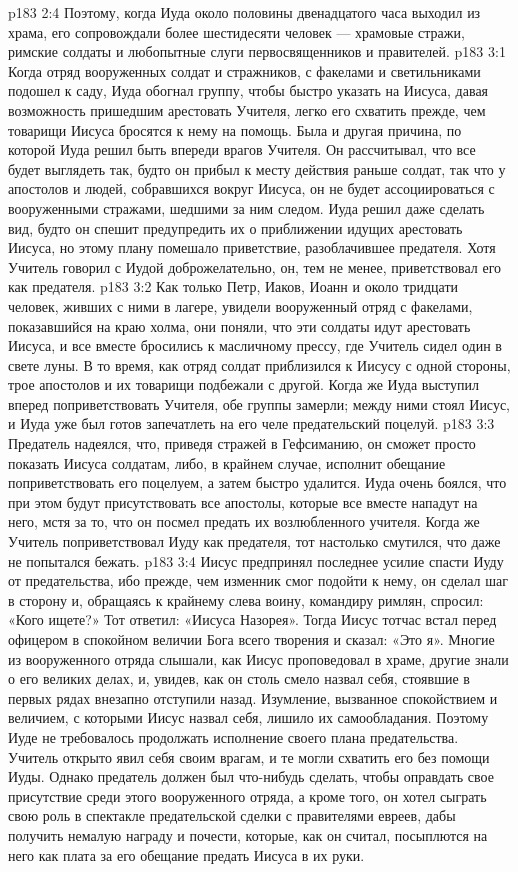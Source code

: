 \vs p183 2:4 Поэтому, когда Иуда около половины двенадцатого часа выходил из храма, его сопровождали более шестидесяти человек --- храмовые стражи, римские солдаты и любопытные слуги первосвященников и правителей.
\vs p183 3:1 Когда отряд вооруженных солдат и стражников, с факелами и светильниками подошел к саду, Иуда обогнал группу, чтобы быстро указать на Иисуса, давая возможность пришедшим арестовать Учителя, легко его схватить прежде, чем товарищи Иисуса бросятся к нему на помощь. Была и другая причина, по которой Иуда решил быть впереди врагов Учителя. Он рассчитывал, что все будет выглядеть так, будто он прибыл к месту действия раньше солдат, так что у апостолов и людей, собравшихся вокруг Иисуса, он не будет ассоциироваться с вооруженными стражами, шедшими за ним следом. Иуда решил даже сделать вид, будто он спешит предупредить их о приближении идущих арестовать Иисуса, но этому плану помешало приветствие, разоблачившее предателя. Хотя Учитель говорил с Иудой доброжелательно, он, тем не менее, приветствовал его как предателя.
\vs p183 3:2 Как только Петр, Иаков, Иоанн и около тридцати человек, живших с ними в лагере, увидели вооруженный отряд с факелами, показавшийся на краю холма, они поняли, что эти солдаты идут арестовать Иисуса, и все вместе бросились к масличному прессу, где Учитель сидел один в свете луны. В то время, как отряд солдат приблизился к Иисусу с одной стороны, трое апостолов и их товарищи подбежали с другой. Когда же Иуда выступил вперед поприветствовать Учителя, обе группы замерли; между ними стоял Иисус, и Иуда уже был готов запечатлеть на его челе предательский поцелуй.
\vs p183 3:3 Предатель надеялся, что, приведя стражей в Гефсиманию, он сможет просто показать Иисуса солдатам, либо, в крайнем случае, исполнит обещание поприветствовать его поцелуем, а затем быстро удалится. Иуда очень боялся, что при этом будут присутствовать все апостолы, которые все вместе нападут на него, мстя за то, что он посмел предать их возлюбленного учителя. Когда же Учитель поприветствовал Иуду как предателя, тот настолько смутился, что даже не попытался бежать.
\vs p183 3:4 Иисус предпринял последнее усилие спасти Иуду от предательства, ибо прежде, чем изменник смог подойти к нему, он сделал шаг в сторону и, обращаясь к крайнему слева воину, командиру римлян, спросил: «Кого ищете?» Тот ответил: «Иисуса Назорея». Тогда Иисус тотчас встал перед офицером в спокойном величии Бога всего творения и сказал: «Это я». Многие из вооруженного отряда слышали, как Иисус проповедовал в храме, другие знали о его великих делах, и, увидев, как он столь смело назвал себя, стоявшие в первых рядах внезапно отступили назад. Изумление, вызванное спокойствием и величием, с которыми Иисус назвал себя, лишило их самообладания. Поэтому Иуде не требовалось продолжать исполнение своего плана предательства. Учитель открыто явил себя своим врагам, и те могли схватить его без помощи Иуды. Однако предатель должен был что\hyp{}нибудь сделать, чтобы оправдать свое присутствие среди этого вооруженного отряда, а кроме того, он хотел сыграть свою роль в спектакле предательской сделки с правителями евреев, дабы получить немалую награду и почести, которые, как он считал, посыплются на него как плата за его обещание предать Иисуса в их руки.
